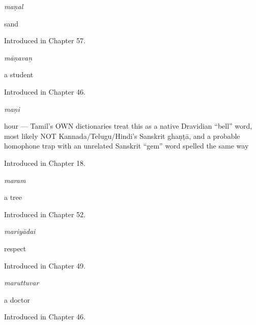 \noindent\begin{minipage}[t]{\linewidth}
\raggedright
\textbf{}\enspace\emph{maṇal}\par
\small sand\par
\footnotesize Introduced in Chapter 57.
\end{minipage}\par\medskip

\noindent\begin{minipage}[t]{\linewidth}
\raggedright
\textbf{}\enspace\emph{māṇavaṉ}\par
\small a student\par
\footnotesize Introduced in Chapter 46.
\end{minipage}\par\medskip

\noindent\begin{minipage}[t]{\linewidth}
\raggedright
\textbf{}\enspace\emph{maṇi}\par
\small hour — Tamil's OWN dictionaries treat this as a native Dravidian \textquotedblleft{}bell\textquotedblright{} word, most likely NOT Kannada/Telugu/Hindi's Sanskrit ghaṇṭā, and a probable homophone trap with an unrelated Sanskrit \textquotedblleft{}gem\textquotedblright{} word spelled the same way\par
\footnotesize Introduced in Chapter 18.
\end{minipage}\par\medskip

\noindent\begin{minipage}[t]{\linewidth}
\raggedright
\textbf{}\enspace\emph{maram}\par
\small a tree\par
\footnotesize Introduced in Chapter 52.
\end{minipage}\par\medskip

\noindent\begin{minipage}[t]{\linewidth}
\raggedright
\textbf{}\enspace\emph{mariyādai}\par
\small respect\par
\footnotesize Introduced in Chapter 49.
\end{minipage}\par\medskip

\noindent\begin{minipage}[t]{\linewidth}
\raggedright
\textbf{}\enspace\emph{maruttuvar}\par
\small a doctor\par
\footnotesize Introduced in Chapter 46.
\end{minipage}\par\medskip

